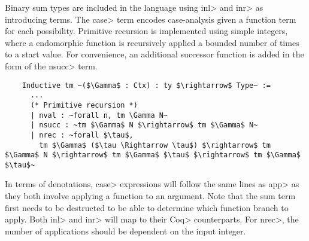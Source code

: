  Binary sum types are included in the language using \<inl> and \<inr> as introducing terms.
  The \<case> term encodes case-analysis given a function term for each possibility.
  Primitive recursion is implemented using simple integers, where a endomorphic function is recursively applied a bounded number of times to a start value.
  For convenience, an additional successor function is added in the form of the \<nsucc> term.

  \begin{verbatim}
    Inductive tm ~($\Gamma$ : Ctx) : ty $\rightarrow$ Type~ :=
      ...
      (* Primitive recursion *)
      | nval : ~forall n, tm \Gamma N~
      | nsucc : ~tm $\Gamma$ N $\rightarrow$ tm $\Gamma$ N~
      | nrec : ~forall $\tau$,
        tm $\Gamma$ ($\tau \Rightarrow \tau$) $\rightarrow$ tm $\Gamma$ N $\rightarrow$ tm $\Gamma$ $\tau$ $\rightarrow$ tm $\Gamma$ $\tau$~
  \end{verbatim}

  In terms of denotations, \<case> expressions will follow the same lines as \<app> as they both involve applying a function to an argument.
  Note that the sum term first needs to be destructed to be able to determine which function branch to apply.
  Both \<inl> and \<inr> will map to their \<Coq> counterparts.
  For \<nrec>, the number of applications should be dependent on the input integer.

